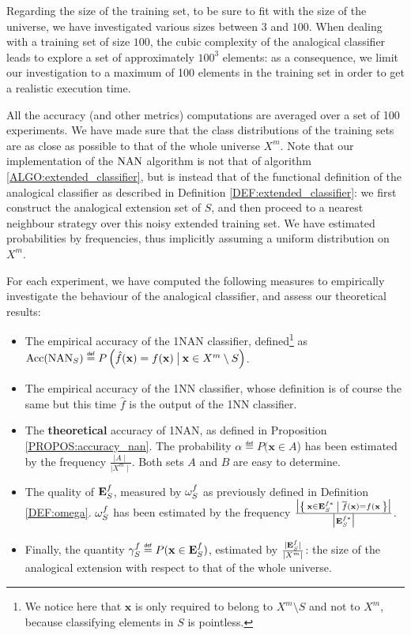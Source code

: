 Regarding the size of the training set, to be sure to fit with the size of the
universe, we have investigated various sizes between $3$ and $100$. When
dealing with a training set of size $100$, the cubic complexity of the
analogical classifier leads to explore a set of approximately $100^3$ elements:
as a consequence, we limit our investigation to a maximum of 100 elements in
the training set in order to get a realistic execution time.

All the accuracy (and other metrics) computations are averaged over a set of
100 experiments. We have made sure that the class distributions of the training
sets are as close as possible to that of the whole universe $X^m$.  Note that
our implementation of the $\mbox{NAN}$ algorithm is not that of algorithm
\ref{ALGO:extended_classifier}, but is instead that of the functional
definition of the analogical classifier as described in Definition
\ref{DEF:extended_classifier}: we first construct the analogical extension set
of $S$, and then proceed to a nearest neighbour strategy over this noisy
extended training set. We have estimated probabilities by frequencies, thus
implicitly assuming a uniform distribution on $X^m$.

For each experiment, we have computed the following measures to empirically
investigate the behaviour of the analogical classifier, and assess our
theoretical results:
\begin{itemize}
  \item The empirical accuracy of the 1NAN classifier, defined\footnote{We
    notice here that $\mathbf{x}$ is only required to belong to $X^m \setminus
    S$ and not to $X^m$, because classifying elements in $S$ is pointless.}
    as\\
    $\acc(\NAN_S) \eqdef P\left(\hat{f}(\mathbf{x}) = f(\mathbf{x})
    \given[\big] \mathbf{x} \in X^m \setminus S \right)$.
  \item The empirical accuracy of the 1NN classifier, whose definition is of
    course the same but this time $\hat{f}$ is the output of the 1NN
    classifier.
  \item The \textbf{theoretical} accuracy of 1NAN, as defined in Proposition
    \ref{PROPOS:accuracy_nan}. The probability $\alpha \eqdef P(\mathbf{x} \in
    A$) has been estimated by the frequency $\frac{\mid A \mid}{\mid X^m
    \mid}$. Both sets $A$ and $B$ are easy to determine.
  \item The quality of $\mathbf{E}_{S}^{f}$, measured by $\omega_{S}^{f}$ as previously defined in
    Definition  \ref{DEF:omega}. $\omega_{S}^{f}$ has been estimated by the
    frequency $\frac{\big| \Set{\mathbf{x} \in \mathbf{E}_{S}^{f*}| \overline{f}(\mathbf{x}) =
    f(\mathbf{x}}\big|}{\big| \mathbf{E}_{S}^{f*} \big|}$.
  \item Finally, the quantity $\gamma_S^f \eqdef P(\mathbf{x} \in \esf)$,
    estimated by $\frac{\mid \mathbf{E}_{S}^{f}\mid}{\mid X^m \mid}$: the size of the
    analogical extension with respect to that of the whole universe.
\end{itemize}


